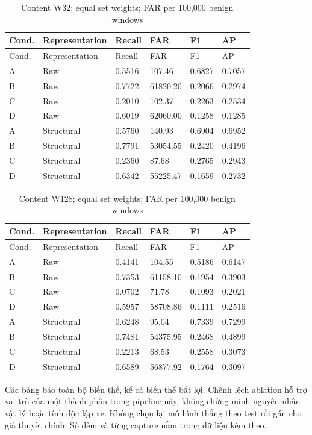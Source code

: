 \documentclass[12pt,a4paper,oneside,openany]{extbook}
\begin{document}
\begin{longtable}{P{1.1cm}P{4.2cm}P{1.6cm}P{2.2cm}P{1.6cm}P{1.6cm}}
\caption{Content W32; equal set weights; FAR per 100,000 benign windows}\label{tab:extension-w32}\\\toprule
Cond. & Representation & Recall & FAR & F1 & AP\\\midrule\endfirsthead
\toprule
Cond. & Representation & Recall & FAR & F1 & AP\\\midrule\endhead
A & Raw & 0.5516 & 107.46 & 0.6827 & 0.7057\\
B & Raw & 0.7722 & 61820.20 & 0.2066 & 0.2974\\
C & Raw & 0.2010 & 102.37 & 0.2263 & 0.2534\\
D & Raw & 0.6019 & 62060.00 & 0.1258 & 0.1285\\
A & Structural & 0.5760 & 140.93 & 0.6904 & 0.6952\\
B & Structural & 0.7791 & 53054.55 & 0.2420 & 0.4196\\
C & Structural & 0.2360 & 87.68 & 0.2765 & 0.2943\\
D & Structural & 0.6342 & 55225.47 & 0.1659 & 0.2732\\
\bottomrule\end{longtable}
\begin{longtable}{P{1.1cm}P{4.2cm}P{1.6cm}P{2.2cm}P{1.6cm}P{1.6cm}}
\caption{Content W128; equal set weights; FAR per 100,000 benign windows}\label{tab:extension-w128}\\\toprule
Cond. & Representation & Recall & FAR & F1 & AP\\\midrule\endfirsthead
\toprule
Cond. & Representation & Recall & FAR & F1 & AP\\\midrule\endhead
A & Raw & 0.4141 & 104.55 & 0.5186 & 0.6147\\
B & Raw & 0.7353 & 61158.10 & 0.1954 & 0.3903\\
C & Raw & 0.0702 & 71.78 & 0.1093 & 0.2021\\
D & Raw & 0.5957 & 58708.86 & 0.1111 & 0.2516\\
A & Structural & 0.6248 & 95.04 & 0.7339 & 0.7299\\
B & Structural & 0.7481 & 54375.95 & 0.2468 & 0.4899\\
C & Structural & 0.2213 & 68.53 & 0.2558 & 0.3073\\
D & Structural & 0.6589 & 56877.92 & 0.1764 & 0.3097\\
\bottomrule\end{longtable}
Các bảng báo toàn bộ biến thể, kể cả biến thể bất lợi. Chênh lệch ablation hỗ trợ vai trò của một thành phần trong pipeline này, không chứng minh nguyên nhân vật lý hoặc tính độc lập xe. Không chọn lại mô hình thắng theo test rồi gán cho giả thuyết chính. Số đếm và từng capture nằm trong dữ liệu kèm theo.
\end{document}
